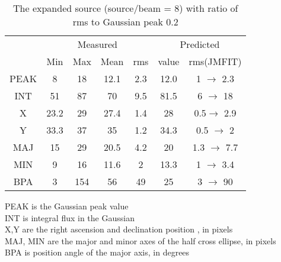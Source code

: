 \begin{table}
\caption{The expanded source (source/beam = 8) with ratio of rms to Gaussian peak  0.2}
\label{tab:4}
\begin{center}
\begin{tabular}{|c| c c c c|c c|} \hline
& \multicolumn{4}{c|}{Measured} &\multicolumn{2}{c|}{Predicted}\\ \cline{2-7}
       & Min& Max& Mean &rms & value& rms(JMFIT)\\
 \hline
PEAK  & 8    & 18   & 12.1  & 2.3 & 12.0  &1 $\rightarrow$ 2.3\\
INT   & 51    &87   & 70   & 9.5 & 81.5   &6 $\rightarrow$ 18\\
X     & 23.2   & 29 & 27.4 & 1.4 & 28 &0.5$\rightarrow$ 2.9\\
Y     & 33.3   & 37 & 35 & 1.2 & 34.3 &0.5 $\rightarrow$ 2\\
MAJ   & 15    & 29 & 20.5  & 4.2 & 20  &1.3 $\rightarrow$ 7.7\\
MIN   & 9    & 16  & 11.6  & 2 & 13.3  &1 $\rightarrow$ 3.4\\
BPA   & 3      &154     & 56    & 49   & 25    & 3 $\rightarrow$ 90\\
\hline
\end{tabular}
\end{center}
{\small
PEAK is the Gaussian peak value \\
INT is integral flux in the Gaussian \\
X,Y are the right ascension and declination position , in pixels \\
MAJ, MIN are the major and minor axes of the half cross ellipse, in pixels \\
BPA is position angle of the major axis, in degrees\\
}
\end{table}










